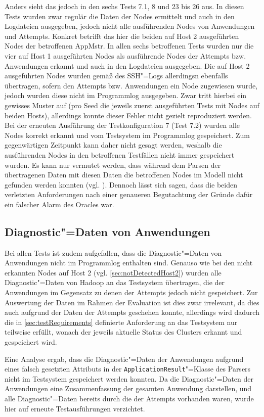 Anders sieht das jedoch in den sechs Tests 7.1, 8 und 23 bis 26 aus.
In diesen Tests wurden zwar regulär die Daten der Nodes ermittelt und auch in den Logdateien ausgegeben, jedoch nicht alle ausführenden Nodes von Anwendungen und Attempts.
Konkret betrifft das hier die beiden auf Host 2 ausgeführten Nodes der betroffenen \ac{AppMstr}.
In allen sechs betroffenen Tests wurden nur die vier auf Host 1 ausgeführten Nodes als ausführende Nodes der Attempts bzw. Anwendungen erkannt und auch in den Logdateien ausgegeben.
Die auf Host 2 ausgeführten Nodes wurden gemäß des SSH"=Logs allerdingsn ebenfalls übertragen, sofern den Attempts bzw. Anwendungen ein Node zugewiesen wurde, jedoch wurden diese nicht im Programmlog ausgegeben.
Zwar tritt hierbei ein gewisses Muster auf (pro Seed die jeweils zuerst ausgeführten Tests mit Nodes auf beiden Hosts), allerdings konnte dieser Fehler nicht gezielt reproduziert werden.
Bei der erneuten Ausführung der Testkonfiguration 7 (Test 7.2) wurden alle Nodes korrekt erkannt und vom Testsystem im Programmlog gespeichert.
Zum gegenwärtigen Zeitpunkt kann daher nicht gesagt werden, weshalb die ausführenden Nodes in den betroffenen Testfällen nicht immer gespeichert wurden.
Es kann nur vermutet werden, dass während dem Parsen der übertragenen Daten mit diesen Daten die betroffenen Nodes im Modell nicht gefunden werden konnten (vgl. ).
Dennoch lässt sich sagen, dass die beiden verletzten Anforderungen nach einer genaueren Begutachtung der Gründe dafür ein falscher Alarm des Oracles war.

\subsection{Diagnostic"=Daten von Anwendungen}
\label{sec:notSavedAppDiagnostics}

Bei allen Tests ist zudem aufgefallen, dass die Diagnostic"=Daten von Anwendungen nicht im Programmlog enthalten sind.
Genauso wie bei den nicht erkannten Nodes auf Host 2 (vgl. \autoref{sec:notDetectedHost2}) wurden alle Diagnostic"=Daten von Hadoop an das Testsystem übertragen, die der Anwendungen im Gegensatz zu denen der Attempts jedoch nicht gespeichert.
Zur Auswertung der Daten im Rahmen der Evaluation ist dies zwar irrelevant, da dies auch aufgrund der Daten der Attempts geschehen konnte, allerdings wird dadurch die in \autoref{sec:testRequirements} definierte Anforderung an das Testsystem nur teilweise erfüllt, wonach der jeweils aktuelle Status des Clusters erkannt und gespeichert wird.

Eine Analyse ergab, dass die Diagnostic"=Daten der Anwendungen aufgrund eines falsch gesetzten Attributs in der \texttt{ApplicationResult}"=Klasse des Parsers nicht im Testsystem gespeichert werden konnten. 
Da die Diagnostic"=Daten der Anwendungen eine Zusammenfassung der gesamten Anwendung darstellen, und alle Diagnostic"=Daten bereits durch die der Attempts vorhanden waren, wurde hier auf erneute Testausführungen verzichtet.
